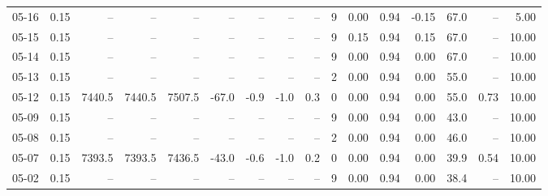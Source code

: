 \begin{threeparttable}
{\begin{tabular}{lrrrrrrrrrrrrrrr}
  05-16 &     0.15 &     -- &     -- &     -- &         -- &             -- &                       -- &                  -- &              9 &       0.00 &      0.94 &          -0.15 &             67.0 &              -- &                   5.00 \\
  05-15 &     0.15 &     -- &     -- &     -- &         -- &             -- &                       -- &                  -- &              9 &       0.15 &      0.94 &           0.15 &             67.0 &              -- &                  10.00 \\
  05-14 &     0.15 &     -- &     -- &     -- &         -- &             -- &                       -- &                  -- &              9 &       0.00 &      0.94 &           0.00 &             67.0 &              -- &                  10.00 \\
  05-13 &     0.15 &     -- &     -- &     -- &         -- &             -- &                       -- &                  -- &              2 &       0.00 &      0.94 &           0.00 &             55.0 &              -- &                  10.00 \\
  05-12 &     0.15 & 7440.5 & 7440.5 & 7507.5 &      -67.0 &           -0.9 &                     -1.0 &                 0.3 &              0 &       0.00 &      0.94 &           0.00 &             55.0 &            0.73 &                  10.00 \\
  05-09 &     0.15 &     -- &     -- &     -- &         -- &             -- &                       -- &                  -- &              9 &       0.00 &      0.94 &           0.00 &             43.0 &              -- &                  10.00 \\
  05-08 &     0.15 &     -- &     -- &     -- &         -- &             -- &                       -- &                  -- &              2 &       0.00 &      0.94 &           0.00 &             46.0 &              -- &                  10.00 \\
  05-07 &     0.15 & 7393.5 & 7393.5 & 7436.5 &      -43.0 &           -0.6 &                     -1.0 &                 0.2 &              0 &       0.00 &      0.94 &           0.00 &             39.9 &            0.54 &                  10.00 \\
  05-02 &     0.15 &     -- &     -- &     -- &         -- &             -- &                       -- &                  -- &              9 &       0.00 &      0.94 &           0.00 &             38.4 &              -- &                  10.00 \\

\end{tabular}}
\end{threeparttable}
